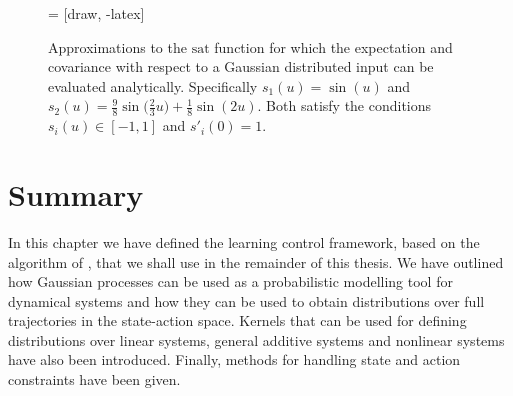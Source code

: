 \begin{figure}[t]
\centering
%
 = [draw, -latex]
%
\caption{Approximations to the $\mathrm{sat}$ function for which the expectation and covariance with respect to a Gaussian distributed input can be evaluated analytically. Specifically $s_1(u) = \sin(u)$ and $s_2(u) = \tfrac{9}{8}\sin\big(\tfrac{2}{3}u\big) + \tfrac{1}{8}\sin(2u)$. Both satisfy the conditions $s_i(u) \in [-1,1]$ and $s'_i(0) = 1$.}
\label{fig:sinsat}
\end{figure}


\section{Summary}
In this chapter we have defined the learning control framework, based on the algorithm of \cite{DR11}, that we shall use in the remainder of this thesis. We have outlined how Gaussian processes can be used as a probabilistic modelling tool for dynamical systems and how they can be used to obtain distributions over full trajectories in the state-action space. Kernels that can be used for defining distributions over linear systems, general additive systems and nonlinear systems have also been introduced. Finally, methods for handling state and action constraints have been given.

